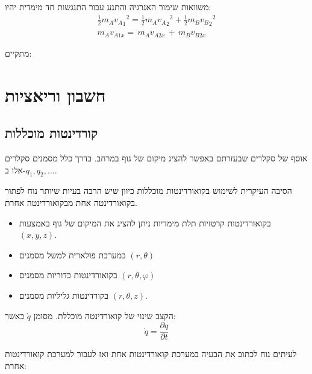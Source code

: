 \documentclass{tstextbook}
\begin{document}
\begin{proposition}
משוואות שימור האנרגיה והתנע עבור התנגשות חד מימדית יהיו:
$$\begin{gather}{\frac{1}{2}}m_{A}{v_{A}}_{1}{}^{2}={\frac{1}{2}}m_{A}{v_{A}}_{2}{}^{2}+{\frac{1}{2}}m_{B}{v_{B}}_{2}{}^{2} \\m_{A}v_{A1x}=\,m_{A}v_{A2x}\,+\,m_{B}v_{B2x}
\end{gather}$$

\end{proposition}
\begin{corollary}
מתקיים:

\end{corollary}
\section{חשבון וריאציות}

\subsection{קורדינטות מוכללות}

\begin{definition}
אוסף של סקלרים שבעזרתם באפשר להציג מיקום של גוף במרחב.
בדרך כלל מסמנים סקלרים אלו ב-\(q_{1},q_{2},\dots\).

\end{definition}
\begin{remark}
הסיבה העיקרית לשימוש בקואורדינטות מוכללות כיוון שיש הרבה בעיות שיותר נוח לפתור בקואורדינטה אחת מבקואורדינטה אחרת.

\end{remark}
\begin{example}
  \begin{itemize}
    \item בקואורדינטות קרטזיות תלת מימדיות ניתן להציג את המיקום של גוף באמצעות \((x,y,z)\).
    \item במערכת פולארית למשל מסמנים \(\left( r,\theta \right)\)
    \item בקואורדינטות כדוריות מסמנים \(\left( r,\theta,\varphi \right)\)
    \item בקורדינטות גליליות מסמנים \(\left( r,\theta,z \right)\).
  \end{itemize}
\end{example}
\begin{definition}
הקצב שינוי של קואורדינטה מוכללת. מסומן \(\dot{q}\) כאשר:
$$\dot{q}=\frac{\partial q}{\partial t}$$

\end{definition}
לעיתים נוח לכתוב את הבעיה במערכת קואורדינטות אחת ואז לעבור למערכת קואורדינטות אחרת:
\end{document}
